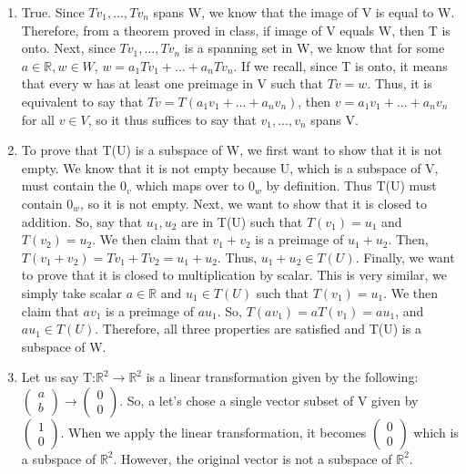 \documentclass{article}
\begin{document}
\begin{enumerate}
\begin{enumerate}
\item True. Since $Tv_1,...,Tv_n$ spans W, we know that the image of V is equal to W. Therefore, from a theorem proved in class, if image of V equals W, then T is onto. Next, since $Tv_1,...,Tv_n$ is a spanning set in W, we know that for some $a \in \mathbb{R}, w \in W$, $w = a_1Tv_1 + ... + a_nTv_n$. If we recall, since T is onto, it means that every w has at least one preimage in V such that $Tv = w$. Thus, it is equivalent to say that $Tv = T(a_1v_1 + ... + a_nv_n)$, then $v = a_1v_1 + ... + a_nv_n$ for all $v \in V$, so it thus suffices to say that $v_1,...,v_n$ spans V.

\item To prove that T(U) is a subspace of W, we first want to show that it is not empty. We know that it is not empty because U, which is a subspace of V, must contain the $0_v$ which maps over to $0_w$ by definition. Thus T(U) must contain $0_w$, so it is not empty. Next, we want to show that it is closed to addition. So, say that $u_1,u_2$ are in T(U) such that $T(v_1) = u_1$ and $T(v_2) = u_2$. We then claim that $v_1 + v_2$ is a preimage of $u_1 + u_2$. Then, $T(v_1 + v_2) = Tv_1 + Tv_2 = u_1 + u_2$. Thus, $u_1 + u_2 \in T(U)$. Finally, we want to prove that it is closed to multiplication by scalar. This is very similar, we simply take scalar $a \in \mathbb{R}$ and $u_1 \in T(U)$ such that $T(v_1) = u_1$. We then claim that $av_1$ is a preimage of $au_1$. So, $T(av_1) = aT(v_1) = au_1$, and $au_1 \in T(U)$. Therefore, all three properties are satisfied and T(U) is a subspace of W.

\item Let us say T:$\mathbb{R}^2 \rightarrow \mathbb{R}^2$ is a linear transformation given by the following: $\left(\begin{array}{c} a \\ b \end{array}\right) \rightarrow \left(\begin{array}{c} 0 \\ 0 \end{array}\right)$. So, a let's chose a single vector subset of V given by $\left(\begin{array}{c} 1 \\ 0 \end{array}\right)$. When we apply the linear transformation, it becomes $\left(\begin{array}{c} 0 \\ 0 \end{array}\right)$ which is a subspace of $\mathbb{R}^2$. However, the original vector is not a subspace of $\mathbb{R}^2$.


\end{enumerate}
\end{enumerate}
\end{document}
